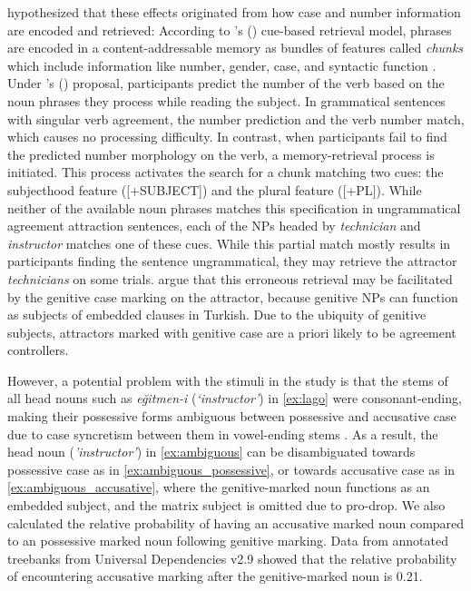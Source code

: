 \documentclass[]{interact}\usepackage[]{graphicx}\usepackage[]{color}
\theoremstyle{plain}%
\theoremstyle{definition}
\theoremstyle{remark}
\newcommand{\rev}[1]{{\color{red}#1}}
\begin{document}
\citet{LagoEtAl:2019} hypothesized that these effects originated from how case and number information \rev{are} encoded and retrieved: According to \citeauthor{LewisVasishth:2005}'s (\citeyear{LewisVasishth:2005}) cue-based retrieval model, phrases are encoded in a content-addressable memory as bundles of features called \textit{chunks} which include information like number, gender, case, and syntactic function \citep[e.g.,][]{SmithVasishth:2020}. Under \citeauthor{LagoEtAl:2019}'s (\citeyear{LagoEtAl:2019}) proposal, participants predict the number of the verb based on the noun phrases they process while reading the subject. In grammatical sentences with singular verb agreement, the number prediction and the verb number match, which causes no processing difficulty. In contrast, when participants fail to find the predicted number morphology on the verb, a memory-retrieval process is initiated. This process activates the search for a chunk matching two cues: the subjecthood feature ([+SUBJECT]) and the plural feature ([+PL]). While neither of the available noun phrases matches this specification in ungrammatical agreement attraction sentences, each of the NPs headed by \textit{technician} and \textit{instructor} matches one of these cues. While this partial match mostly results in participants finding the sentence ungrammatical, they may retrieve the attractor \textit{technicians} on some trials. \citet{LagoEtAl:2019} argue that this erroneous retrieval may be facilitated by the genitive case marking on the attractor, because genitive NPs can function as subjects of embedded clauses in Turkish. Due to the ubiquity of genitive subjects, attractors marked with genitive case are a priori likely to be agreement controllers.

However, a potential problem with the stimuli in the \citet{LagoEtAl:2019} study is that the stems of all head nouns such as \textit{e\u{g}itmen-i} (\textit{`instructor'}) in \ref{ex:lago} were consonant-ending, making their possessive forms ambiguous between possessive and accusative case due to case syncretism between them in vowel-ending stems \citep[pp. 66--67]{GokselKerslake:2005}. As a result, the head noun (\textit{'instructor'}) in \ref{ex:ambiguous} can be disambiguated towards possessive case as in \ref{ex:ambiguous_possessive}, or towards accusative case as in \ref{ex:ambiguous_accusative}, where the genitive-marked noun functions as an embedded subject, and the matrix subject is omitted due to pro-drop. 
\rev{We also calculated the relative probability of having an accusative marked noun compared to an possessive marked noun following genitive marking. Data from annotated treebanks from Universal Dependencies v2.9 \citep{TurkEtAl2021,KuzgunEtAl2020,TurkEtAl2019b,SulubacakEtAl2016,Coltekin2015} showed that the relative probability of encountering accusative marking after the genitive-marked noun is 0.21.} 
\end{document}
